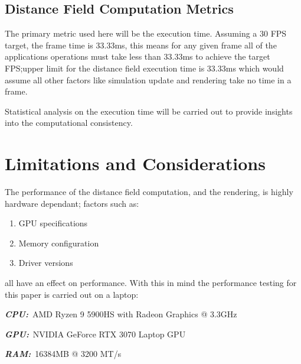\subsection{Distance Field Computation Metrics}\label{sec:distance_field_metrics}
The primary metric used here will be the execution time. Assuming a 30 FPS target, the frame time is 33.33ms, this means
for any given frame all of the applications operations must take less than 33.33ms to achieve the target FPS;\@the upper
limit for the distance field execution time is 33.33ms which would assume all other factors like simulation update and
rendering take no time in a frame.

Statistical analysis on the execution time will be carried out to provide insights into the computational consistency.

\section{Limitations and Considerations}
The performance of the distance field computation, and the rendering, is highly hardware dependant; factors such as:

\begin{enumerate}
    \item GPU specifications
    \item Memory configuration
    \item Driver versions
\end{enumerate}

all have an effect on performance. With this in mind the performance testing for this paper is carried out on a laptop:

\begin{description}
    \item \textbf{\textit{CPU:}}~AMD Ryzen 9 5900HS with Radeon Graphics @ 3.3GHz
    \item \textbf{\textit{GPU:}}~NVIDIA GeForce RTX 3070 Laptop GPU
    \item \textbf{\textit{RAM:}}~16384MB @ 3200 MT/s
\end{description}
